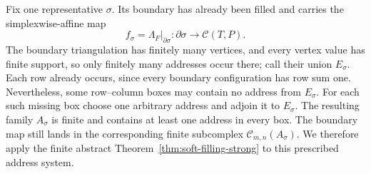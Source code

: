 \documentclass[11pt,reqno]{amsart}
\numberwithin{equation}{section}
\theoremstyle{definition}
\theoremstyle{remark}
\begin{document}
Fix one representative $\sigma$.  Its boundary has already been filled and carries the
simplexwise-affine map
\begin{equation}\label{eq:cell-boundary-map}
 f_\sigma=\Lambda_F|_{\partial\sigma}:
 \partial\sigma\longrightarrow\mathcal C(T,P).
\end{equation}
The boundary triangulation has finitely many vertices, and every vertex
value has finite support, so only finitely many addresses occur there; call
their union $E_\sigma$.  Each row already occurs, since every boundary
configuration has row sum one.  Nevertheless, some row--column boxes may
contain no address from $E_\sigma$.  For each such missing box choose one
arbitrary address and adjoin it to $E_\sigma$.  The resulting family
$A_\sigma$ is finite and contains at least one address in every box.  The
boundary map still lands in the corresponding finite subcomplex
$\mathcal C_{m,n}(A_\sigma)$.  We therefore apply the finite abstract
Theorem~\ref{thm:soft-filling-strong} to this prescribed address system.
\end{document}
